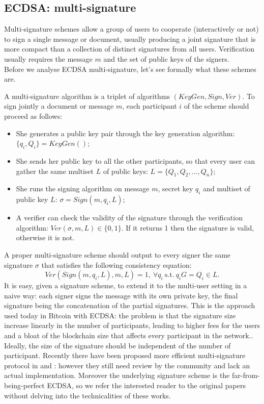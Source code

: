 \bigskip

\subsection{ECDSA: multi-signature}
Multi-signature schemes allow a group of users to cooperate (interactively or not) to sign a single message or document, usually producing a joint signature that is more compact than a collection of distinct signatures from all users. Verification usually requires the message $m$ and the set of public keys of the signers.
\\
Before we analyse ECDSA multi-signature, let's see formally what these schemes are.

\bigskip
\noindent
A multi-signature algorithm is a triplet of algorithms $(KeyGen, Sign, Ver)$. To sign jointly a document or message $m$, each participant $i$ of the scheme should proceed as follows:
\begin{itemize}
	\item She generates a public key pair through the key generation algorithm: $\{q_i, Q_i\} = KeyGen()$;
	\item She sends her public key to all the other participants, so that every user can gather the same multiset $L$ of public keys: $L = \{Q_1, Q_2, ..., Q_n\}$;
	\item She runs the signing algorithm on message $m$, secret key $q_i$ and multiset of public key $L$: $\sigma = Sign(m, q_i, L)$;
	\item A verifier can check the validity of the signature through the verification algorithm: $Ver(\sigma, m, L) \in \{0, 1\}$. If it returns 1 then the signature is valid, otherwise it is not.
\end{itemize}
A proper multi-signature scheme should output to every signer the same signature $\sigma$ that satisfies the following consistency equation: 
$$Ver(Sign(m, q_i, L), m, L) = 1, \ \forall q_i \ \text{s.t.} \ q_iG = Q_i \in L.$$
It is easy, given a signature scheme, to extend it to the multi-user setting in a naive way: each signer signs the message with its own private key, the final signature being the concatenation of the partial signatures. This is the approach used today in Bitcoin with ECDSA: the problem is that the signature size increase linearly in the number of participants, leading to higher fees for the users and a bloat of the blockchain size that affects every participant in the network.. Ideally, the size of the signature should be independent of the number of participant. Recently there have been proposed more efficient multi-signature protocol in \cite{ECDSA1} and \cite{ECDSA2}: however they still need review by the community and lack an actual implementation. Moreover the underlying signature scheme is the far-from-being-perfect ECDSA, so we refer the interested reader to the original papers without delving into the technicalities of these works.

